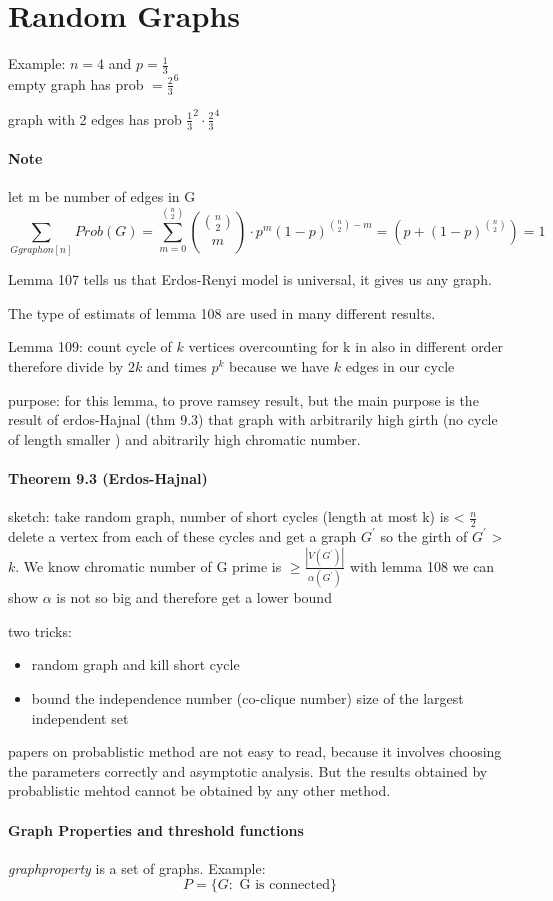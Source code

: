 \section{Random Graphs}
Example: $ n = 4 $ and $ p = \frac{1}{3} $
\\
empty graph has prob $ = \frac{2}{3}^6 $

\smallskip
graph with 2 edges has prob $ \frac{1}{3}^2 \cdot \frac{2}{3}^4 $

\paragraph{Note}
let m be number of edges in G
$$ \sum_{G graph on [n]} Prob(G) = \sum_{m=0}^{\binom{n}{2}} \binom{\binom{n}{2}}{m}
\cdot p^m (1-p)^{\binom{n}{2}-m} = (p + (1 -p)^{\binom{n}{2}}) = 1 $$

\smallskip
Lemma 107 tells us that Erdos-Renyi model is universal, it gives us any graph.

\smallskip
The type of estimats of lemma 108 are used in many different results.

\smallskip
Lemma 109: count cycle of $ k $ vertices overcounting for k in also in different order 
therefore divide by $ 2k $ and times $ p^k $ because we have $ k $ edges in our cycle

\smallskip
purpose: for this lemma, to prove ramsey result, but the main purpose is the result
of erdos-Hajnal (thm 9.3) that graph with arbitrarily high girth (no cycle of length smaller ) and abitrarily high chromatic number.


\paragraph{Theorem 9.3 (Erdos-Hajnal)} 
sketch: take random graph, number of short cycles (length at most k) is < $ \frac{n}{2} $ 
delete a vertex from each of these cycles and get a graph $G^\prime $ so the girth
of $ G^\prime $ > $ k $.
We know chromatic number of G prime is $ \geq \frac{|V(G^\prime)|}{\alpha(G^\prime)} $
with lemma 108 we can show $ \alpha $ is not so big and therefore get a lower bound

\smallskip
two tricks: 
\begin{itemize}
    \item random graph and kill short cycle 
    \item bound the independence number (co-clique number) size of the largest 
    independent set
\end{itemize}

\bigskip 
papers on probablistic method are not easy to read, because it involves choosing the 
parameters correctly and asymptotic analysis. But the results obtained by 
probablistic mehtod cannot be obtained by any other method.

\paragraph{Graph Properties and threshold functions}
\textit{graphproperty} is a set of graphs. 
 Example: $$\textit{P} = \{G: \text{ G is connected}\}  $$

 
